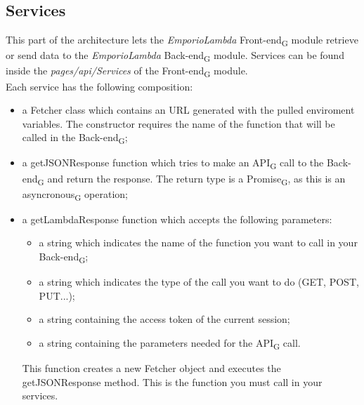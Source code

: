 \subsection{Services}
This part of the architecture lets the \textit{EmporioLambda} Front-end\textsubscript{G} module retrieve or send data to the \textit{EmporioLambda} Back-end\textsubscript{G} module. Services can be found inside the \textit{pages/api/Services} of the Front-end\textsubscript{G} module.\\
Each service has the following composition:
\begin{itemize}
\item a Fetcher class which contains an URL generated with the pulled enviroment variables. The constructor requires the name of the function that will be called in the Back-end\textsubscript{G};
\item a getJSONResponse function which tries to make an API\textsubscript{G} call to the Back-end\textsubscript{G} and return the response. The return type is a Promise\textsubscript{G}, as this is an asyncronous\textsubscript{G} operation;
\item a getLambdaResponse function which accepts the following parameters:\begin{itemize}
\item a string which indicates the name of the function you want to call in your Back-end\textsubscript{G}; 
\item a string which indicates the type of the call you want to do (GET, POST, PUT...);
\item a string containing the access token of the current session; 
\item a string containing the parameters needed for the API\textsubscript{G} call. 
\end{itemize} 
This function creates a new Fetcher object and executes the getJSONResponse method. This is the function you must call in your services.
\end{itemize}
